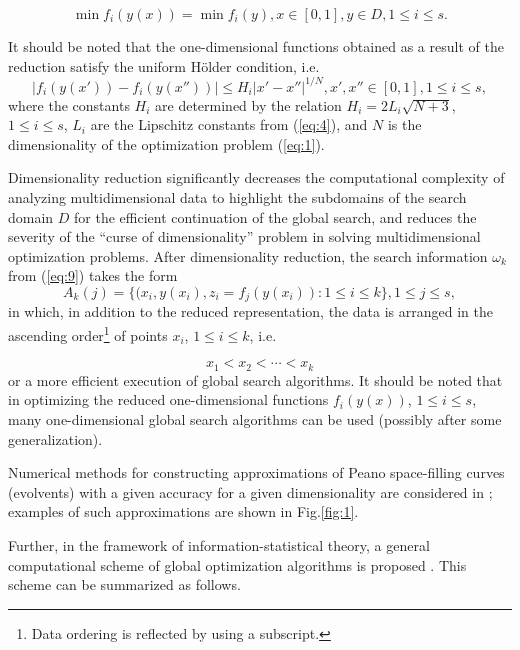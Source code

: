 \documentclass[review]{elsarticle}
\begin{document}
\begin{equation}\label{eq:11}
\min {f_i (y(x))} = \min{f_i (y)}, x \in [0,1], y \in D, 1 \leq i \leq s.
\end{equation}

It should be noted that the one-dimensional functions obtained as a result of the reduction satisfy the uniform H\"older condition, i.e.
\begin{equation}\label{eq:12}
|f_i (y(x'))-f_i (y(x''))| \leq H_i |x'-x''|^{1/N}, x',x''\in [0,1], 1 \leq i \leq s,
\end{equation}
where the constants $H_i$ are determined by the relation $H_i = 2L_i \sqrt{N+3}$, ${1 \leq i \leq s}$, $L_i$ are the Lipschitz constants from (\ref{eq:4}), and $N$ is the dimensionality of the optimization problem (\ref{eq:1}).

Dimensionality reduction significantly decreases the computational complexity of analyzing multidimensional data to highlight the subdomains of the search domain $D$ for the efficient continuation of the global search, and reduces the severity of the ``curse of dimensionality'' problem in solving multidimensional optimization problems. After dimensionality reduction, the search information $\omega_k$ from (\ref{eq:9}) takes the form
\begin{equation}\label{eq:13}
A_k (j)=\{ (x_i, y(x_i), z_i=f_j (y(x_i) ): 1 \leq i \leq k \}, 1 \leq j \leq s,
\end{equation}
in which, in addition to the reduced representation, the data is arranged in the ascending order\footnote{Data ordering is reflected by using a subscript.} of points $x_i$,  $1 \leq i \leq k$, i.e.

\begin{equation}\label{eq:14}
x_1< x_2< \cdots < x_k
\end{equation}
or a more efficient execution of global search algorithms. It should be noted that in optimizing the reduced one-dimensional functions $f_i (y(x))$, $1 \leq i \leq s$, many one-dimensional global search algorithms can be used (possibly after some generalization).

Numerical methods for constructing approximations of Peano space-filling curves (evolvents) with a given accuracy for a given dimensionality are considered in \cite{c6}; examples of such approximations are shown in Fig.\ref{fig:1}.

Further, in the framework of information-statistical theory, a general computational scheme of global optimization algorithms is proposed \cite{c6}. This scheme can be summarized as follows.
\end{document}
